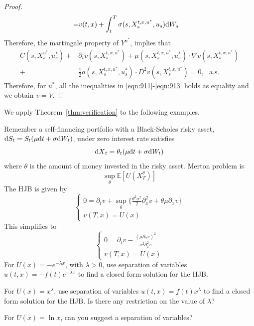 \documentclass[11pt]{book}
\newcommand{\dd}{\text{\normalfont d}}
\newcommand{\dt}{\text{\normalfont d}t}
\newcommand{\dX}{\text{\normalfont d}X}
\newcommand{\dW}{\text{\normalfont d}W}
\begin{document}
\begin{proof}
\begin{equation}
\begin{split}
=&v(t,x)+\int_t^T\sigma(s,X_s^{t,x,u^*},u_s)\dW_s
\end{split}
\end{equation}
Therefore, the martingale property of $Y^{u^*}$, implies that
\begin{equation}
\begin{split}
C(s,X_s^{u^*},u^*_s)+&\partial_{t}v(s,X_s^{t,x,u^*})+\mu(s,X_s^{t,x,u^*},u^*_s)\cdot\nabla v(s,X_s^{t,x,u^*})\\
+&\frac12{a(s,X_s^{t,x,u^*},u^*_s)}\cdot D^2v(s,X_s^{t,x,u^*})=0,~~~\textrm{a.s.}
\end{split}
\end{equation}
Therefore, for $u^*$, all the inequalities in \eqref{eqn:911}-\eqref{eqn:913} holds as equality and we obtain $v=V$.
\end{proof}
We apply Theorem~\eqref{thm:verification} to the following examples.
\begin{ex}
    {}
    Remember a self-financing portfolio with a 
    Black-Scholes risky asset, 
    ${{\dd}}S_t=S_t(\mu {{\dt}}+\sigma \dW_t)$, 
    under zero interest rate  satisfies
    \begin{equation}
        {\dX}_t=\theta_t(\mu {{\dt}}+ \sigma \dW_t)
    \end{equation}
    where $\theta$ is the amount of money invested in the risky asset.
    Merton problem is 
    \begin{equation}
        \sup_{\theta}\mathbb{E}[U(X_T^\theta)]
    \end{equation}
     The HJB is given by
     \begin{equation}
         \begin{cases}
             0=\partial_t v+ \sup_{\theta}\bigg\{\frac{\theta^2\sigma^2}{2}\partial^2_x v+\theta\mu \partial_x v\bigg\}\\
             v(T,x)=U(x)
         \end{cases}
     \end{equation}
     This simplifies to 
          \begin{equation}\label{eqn:HJB_merton_investment}
         \begin{cases}
             0=\partial_t v-\frac{(\mu \partial_x v)^2}{\sigma^2 \partial^2_x v}\\
             v(T,x)=U(x)
         \end{cases}
     \end{equation}
     For $U(x)=-e^{-\lambda x}$, with $\lambda>0$, use separation of variables $u(t,x)=-f(t)e^{-\lambda x}$ to find a closed form solution for the HJB.
\end{ex}
\begin{ex}
    For $U(x)=x^\lambda$, use separation of variables $u(t,x)=f(t)x^\lambda$ to find a closed form solution for the HJB. Is there any restriction on the value of $\lambda$?
\end{ex}
\begin{ex}
    For $U(x)=\ln x$, can you suggest a separation of variables?
\end{ex}
\end{document}
